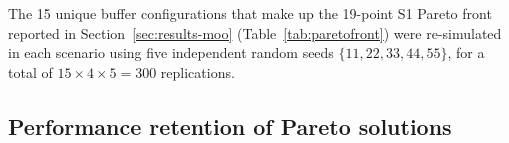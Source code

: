 \documentclass[a4paper,fleqn]{cas-sc}
\begin{document}
  The 15 unique buffer configurations that make up the 19-point S1 Pareto                                                                   
  front reported in Section~\ref{sec:results-moo}                                                                                           
  (Table~\ref{tab:paretofront}) were re-simulated in each scenario using                                                                    
  five independent random seeds $\{11,22,33,44,55\}$, for a total of  $15 \times 4 \times 5 = 300$ replications. %
                                                                                                                                            
  \subsection{Performance retention of Pareto solutions}\label{sec:res-r1}                                                                  
                                                                    
\end{document}
